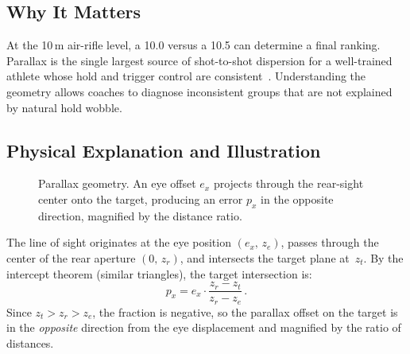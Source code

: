 \documentclass[11pt]{article}
\begin{document}
\subsection{Why It Matters}
At the 10\,m air-rifle level, a 10.0 versus a 10.5 can determine a
final ranking.  Parallax is the single largest source of shot-to-shot
dispersion for a well-trained athlete whose hold and trigger control
are consistent~\cite{nra}.  Understanding the geometry allows
coaches to diagnose inconsistent groups that are not explained by
natural hold wobble.

\subsection{Physical Explanation and Illustration}

\begin{figure}[H]
\centering
{}
\caption{Parallax geometry.  An eye offset $e_x$ projects through
the rear-sight center onto the target, producing an error $p_x$ in
the opposite direction, magnified by the distance ratio.}
\label{fig:parallax}
\end{figure}

The line of sight originates at the eye position
$(e_x,\,z_e)$, passes through the center of the rear aperture
$(0,\,z_r)$, and intersects the target plane at~$z_t$.  By the
intercept theorem (similar triangles), the target intersection is:
\begin{equation}\label{eq:parallax}
  p_x = e_x \cdot \frac{z_r - z_t}{z_r - z_e}\,.
\end{equation}
Since $z_t > z_r > z_e$, the fraction is negative, so the parallax
offset on the target is in the \emph{opposite} direction from the
eye displacement and magnified by the ratio of distances.
\end{document}
